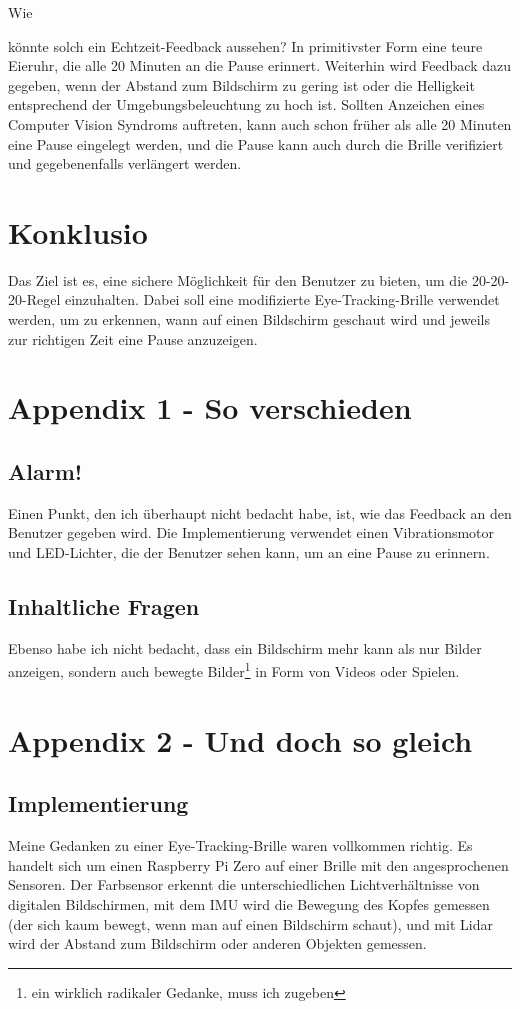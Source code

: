 Wie

 könnte solch ein Echtzeit-Feedback aussehen? In primitivster Form eine teure Eieruhr, die alle 20 Minuten an die Pause erinnert. Weiterhin wird Feedback dazu gegeben, wenn der Abstand zum Bildschirm zu gering ist oder die Helligkeit entsprechend der Umgebungsbeleuchtung zu hoch ist. Sollten Anzeichen eines Computer Vision Syndroms auftreten, kann auch schon früher als alle 20 Minuten eine Pause eingelegt werden, und die Pause kann auch durch die Brille verifiziert und gegebenenfalls verlängert werden.

\section{Konklusio}

Das Ziel ist es, eine sichere Möglichkeit für den Benutzer zu bieten, um die 20-20-20-Regel einzuhalten. Dabei soll eine modifizierte Eye-Tracking-Brille verwendet werden, um zu erkennen, wann auf einen Bildschirm geschaut wird und jeweils zur richtigen Zeit eine Pause anzuzeigen.

\newpage

\section{Appendix 1 - So verschieden}

\subsection{Alarm!}

Einen Punkt, den ich überhaupt nicht bedacht habe, ist, wie das Feedback an den Benutzer gegeben wird. Die Implementierung verwendet einen Vibrationsmotor und LED-Lichter, die der Benutzer sehen kann, um an eine Pause zu erinnern.

\subsection{Inhaltliche Fragen}

Ebenso habe ich nicht bedacht, dass ein Bildschirm mehr kann als nur Bilder anzeigen, sondern auch bewegte Bilder\footnote{ein wirklich radikaler Gedanke, muss ich zugeben} in Form von Videos oder Spielen.

\section{Appendix 2 - Und doch so gleich}

\subsection{Implementierung}

Meine Gedanken zu einer Eye-Tracking-Brille waren vollkommen richtig. Es handelt sich um einen Raspberry Pi Zero auf einer Brille mit den angesprochenen Sensoren. Der Farbsensor erkennt die unterschiedlichen Lichtverhältnisse von digitalen Bildschirmen, mit dem IMU wird die Bewegung des Kopfes gemessen (der sich kaum bewegt, wenn man auf einen Bildschirm schaut), und mit Lidar wird der Abstand zum Bildschirm oder anderen Objekten gemessen.
